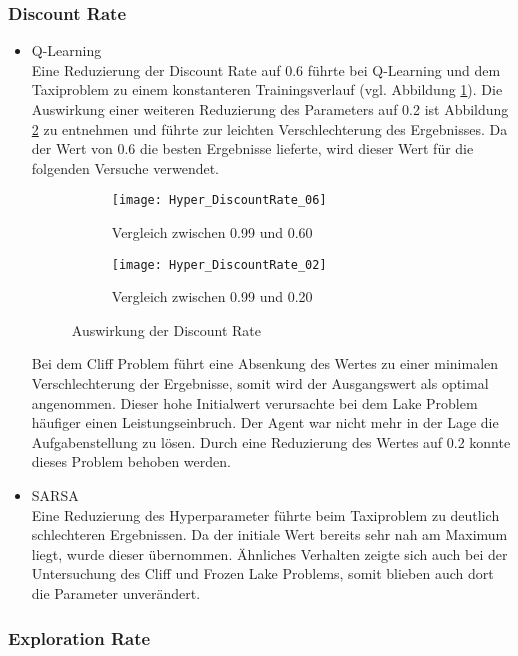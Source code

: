 \subsubsection{Discount Rate}
\begin{itemize}
    \item Q-Learning\\
    Eine Reduzierung der Discount Rate auf 0.6 führte bei Q-Learning und dem Taxiproblem zu einem konstanteren Trainingsverlauf (vgl. Abbildung \ref{fig:DiscountRate06}).
    Die Auswirkung einer weiteren Reduzierung des Parameters auf 0.2 ist Abbildung \ref{fig:DiscountRate02} zu entnehmen und führte zur leichten Verschlechterung des Ergebnisses.
    Da der Wert von 0.6 die besten Ergebnisse lieferte, wird dieser Wert für die folgenden Versuche verwendet.
    \begin{figure}[H]
        \centering
        \begin{subfigure}{.5\textwidth}
          \centering
          \texttt{[image: Hyper\_DiscountRate\_06]}
          \caption{Vergleich zwischen 0.99 und 0.60}
          \label{fig:DiscountRate06}
        \end{subfigure}%
        \begin{subfigure}{.5\textwidth}
          \centering
          \texttt{[image: Hyper\_DiscountRate\_02]}
          \caption{Vergleich zwischen 0.99 und 0.20}
          \label{fig:DiscountRate02}
        \end{subfigure}
        \caption{Auswirkung der Discount Rate}
        \label{fig:DiscountRate_Q-Learning}
    \end{figure}
    Bei dem Cliff Problem führt eine Absenkung des Wertes zu einer minimalen Verschlechterung der Ergebnisse, somit wird der Ausgangswert als optimal angenommen. 
    Dieser hohe Initialwert verursachte bei dem Lake Problem häufiger einen Leistungseinbruch. Der Agent war nicht mehr in der Lage die Aufgabenstellung zu lösen.
    Durch eine Reduzierung des Wertes auf 0.2 konnte dieses Problem behoben werden.
    \item SARSA\\
    Eine Reduzierung des Hyperparameter führte beim Taxiproblem zu deutlich schlechteren Ergebnissen. Da der initiale Wert bereits sehr nah am Maximum liegt, wurde dieser übernommen.
  Ähnliches Verhalten zeigte sich auch bei der Untersuchung des Cliff und Frozen Lake Problems, somit blieben auch dort die Parameter unverändert.
\end{itemize}
\subsubsection{Exploration Rate}

